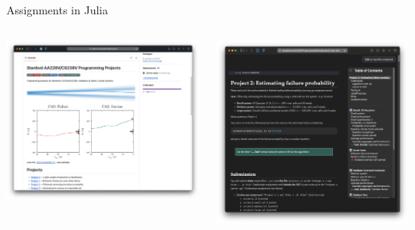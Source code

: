 \begin{frame}[fragile]{Assignments in Julia} \pause

\begin{columns}
  \begin{column}{0.45\textwidth}
    \centering
    \includegraphics[width=\linewidth]{media/AA228VProjects.png}

  \end{column}
  \pause
  \begin{column}{0.45\textwidth}
    \centering
    \includegraphics[width=\linewidth]{media/project2.png}

  \end{column}
  \hfill
\end{columns}

\end{frame}


